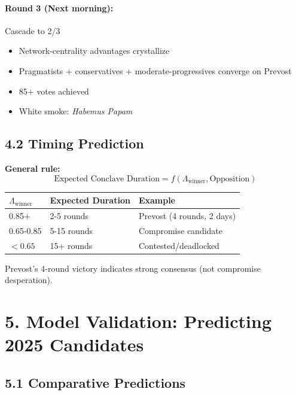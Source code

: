 \paragraph{Round 3 (Next morning):} Cascade to 2/3
\begin{itemize}
\item Network-centrality advantages crystallize
\item Pragmatists + conservatives + moderate-progressives converge on Prevost
\item 85+ votes achieved
\item White smoke: \textit{Habemus Papam}
\end{itemize}

\subsection{4.2 Timing Prediction}

\textbf{General rule:}
\begin{equation}
\text{Expected Conclave Duration} = f(\Lambda_{\text{winner}}, \text{Opposition})
\end{equation}

\begin{table}[h]
\centering
\begin{tabular}{|l|l|l|}
\hline
$\Lambda_{\text{winner}}$ & \textbf{Expected Duration} & \textbf{Example} \\
\hline
0.85+ & 2-5 rounds & Prevost (4 rounds, 2 days) \\
0.65-0.85 & 5-15 rounds & Compromise candidate \\
$<0.65$ & 15+ rounds & Contested/deadlocked \\
\hline
\end{tabular}
\end{table}

Prevost's 4-round victory indicates strong consensus (not compromise desperation).

\section{5. Model Validation: Predicting 2025 Candidates}

\subsection{5.1 Comparative Predictions}


